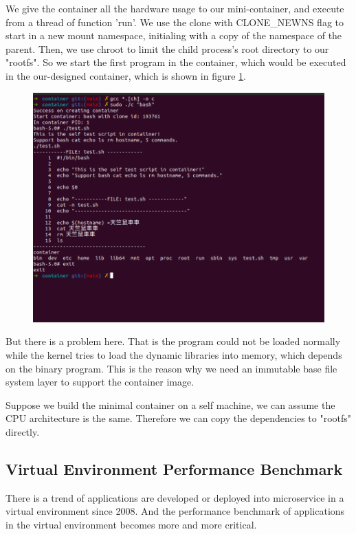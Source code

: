 We give the container all the hardware usage to our mini-container, and execute from a thread of
function 'run'.
% 
We use the clone %
with CLONE\_NEWNS flag to start in a new mount namespace, initialing with a copy of the
namespace of the parent. Then, we use chroot to limit the child process's root directory
to our "rootfs".
% 
So we start the first program in the container, which would be executed in the
our-designed container, which is shown in figure \ref{lc}.
    {
        \begin{figure}
            \centering
            \includegraphics[width=.5\textwidth]{src/cur_cont.png}
            \label{lc}
        \end{figure}
    }
% 

But there is a problem here. That is the program could not be loaded normally while
the kernel tries to load the dynamic libraries into memory, which depends on the
binary program. This is the reason why we need an immutable base file system layer to
support the container image.

Suppose we build the minimal container on a self machine, we can assume the CPU architecture
is the same. Therefore we can copy the dependencies to "rootfs" directly.

% 

\subsection{Virtual Environment Performance Benchmark}
There is a trend of applications are developed or deployed into microservice in a virtual
environment since 2008. And the performance benchmark of applications in the virtual
environment becomes more and more critical.

